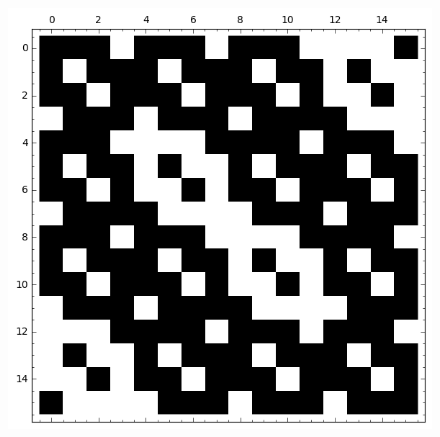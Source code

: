 \documentclass[pdf,sprung,slideColor,nocolorBG]{beamer}
\newenvironment{colortheme}[1]{
\def\ProvidesPackageRCS $##1${\relax}
\renewcommand{\ProcessOptions}{\relax}
\makeatletter

\makeatother
}{}
\begin{document}
\begin{colortheme}{jubata}
\begin{frame}
\begin{figure}
\begin{minipage}{.48\textwidth}
  \label{fig:c4_1_weight_class_matrix}
\end{minipage}%
\begin{minipage}{.48\textwidth}
  \centering
  \includegraphics[width=.9\linewidth]{../matrix_plot/c4_1_bent_cayley_graph_index_matrix.png}
  \label{fig:c4_1_bent_cayley_graph_index_matrix}
\end{minipage}
\end{figure}
\end{frame}

\end{colortheme}
\end{document}
